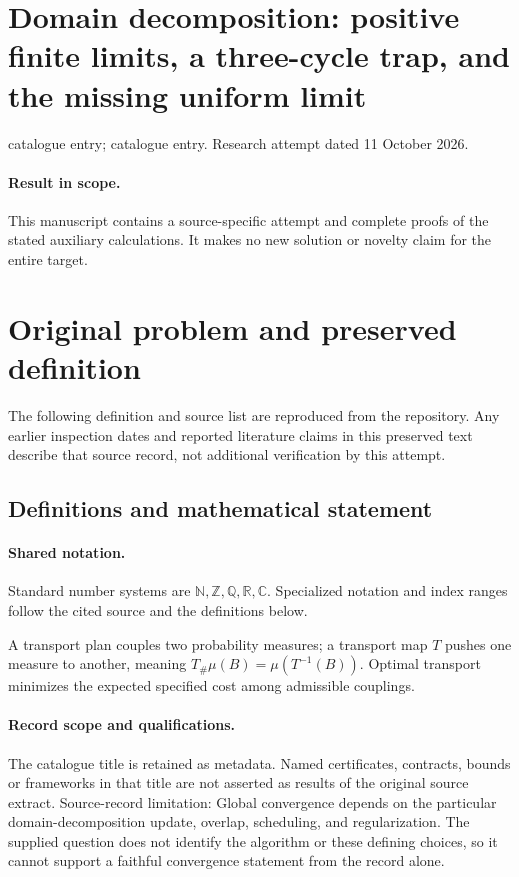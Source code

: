 \documentclass[11pt]{article}
\begin{document}
\section*{Domain decomposition: positive finite limits, a three-cycle trap, and the missing uniform limit}
\noindent catalogue entry; catalogue entry. Research attempt dated 11 October 2026.
\paragraph{Result in scope.}This manuscript contains a source-specific attempt and complete proofs of the stated auxiliary calculations. It makes no new solution or novelty claim for the entire target.
\section{Original problem and preserved definition}
The following definition and source list are reproduced from the repository. Any earlier inspection dates and reported literature claims in this preserved text describe that source record, not additional verification by this attempt.
\subsection{Definitions and mathematical statement}

\paragraph{Shared notation.}Standard number systems are $\mathbb N,\mathbb Z,\mathbb Q,\mathbb R,\mathbb C$. Specialized notation and index ranges follow the cited source and the definitions below.


A transport plan couples two probability measures; a transport map $T$ pushes one measure to another, meaning $T_\#\mu(B)=\mu(T^{-1}(B))$. Optimal transport minimizes the expected specified cost among admissible couplings.
\paragraph{Record scope and qualifications.}
The catalogue title is retained as metadata. Named certificates, contracts, bounds or frameworks in that title are not asserted as results of the original source extract.
Source-record limitation: Global convergence depends on the particular domain-decomposition update, overlap, scheduling, and regularization. The supplied question does not identify the algorithm or these defining choices, so it cannot support a faithful convergence statement from the record alone.
\end{document}
